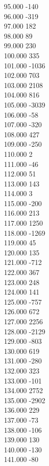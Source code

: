 { 95.000	-140 \\
 96.000	-319 \\
 97.000	182 \\
 98.000	89 \\
 99.000	230 \\
 100.000	335 \\
 101.000	-1036 \\
 102.000	703 \\
 103.000	2108 \\
 104.000	816 \\
 105.000	-3039 \\
 106.000	-58 \\
 107.000	-320 \\
 108.000	427 \\
 109.000	-250 \\
 110.000	2 \\
 111.000	-46 \\
 112.000	51 \\
 113.000	143 \\
 114.000	3 \\
 115.000	-200 \\
 116.000	213 \\
 117.000	1250 \\
 118.000	-1269 \\
 119.000	45 \\
 120.000	135 \\
 121.000	-712 \\
 122.000	367 \\
 123.000	248 \\
 124.000	141 \\
 125.000	-757 \\
 126.000	672 \\
 127.000	2256 \\
 128.000	-2129 \\
 129.000	-803 \\
 130.000	619 \\
 131.000	-280 \\
 132.000	323 \\
 133.000	-101 \\
 134.000	2752 \\
 135.000	-2902 \\
 136.000	229 \\
 137.000	-73 \\
 138.000	-106 \\
 139.000	130 \\
 140.000	-130 \\
 141.000	-80 \\
}
